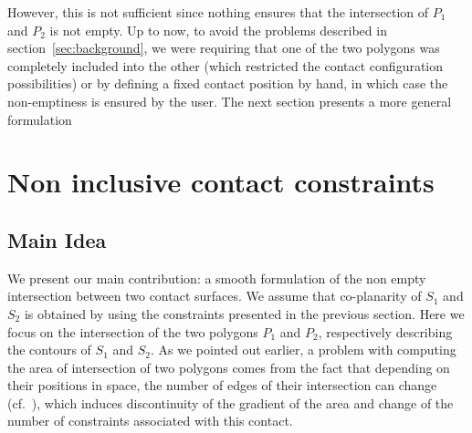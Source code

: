 However, this is not sufficient since nothing ensures that the intersection of $P_1$ and $P_2$ is not empty.
Up to now, to avoid the problems described in section~\ref{sec:background}, we were requiring that one of the two polygons was completely included into the other (which restricted the contact configuration possibilities) or by defining a fixed contact position by hand, in which case the non-emptiness is ensured by the user. The next section presents a more general formulation

\section{Non inclusive contact constraints}
\label{sec:ellipse}
\subsection{Main Idea}
\label{subsec:idea}
We present our main contribution: a smooth formulation of the non empty intersection between two contact surfaces. We assume that co-planarity of $S_1$ and $S_2$ is obtained by using the constraints presented in the previous section. Here we focus on the intersection of the two polygons $P_1$ and $P_2$, respectively describing the contours of $S_1$ and $S_2$.
As we pointed out earlier, a problem with computing the area of intersection of two polygons comes from the fact that depending on their positions in space, the number of edges of their intersection can change (cf.~), which induces discontinuity of the gradient of the area and change of the number of constraints associated with this contact.

